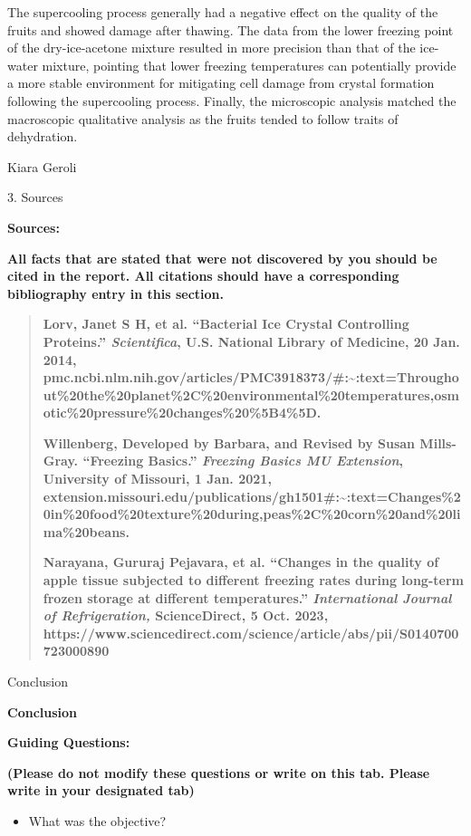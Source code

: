 The supercooling process generally had a negative effect on the quality
of the fruits and showed damage after thawing. The data from the lower
freezing point of the dry-ice-acetone mixture resulted in more precision
than that of the ice-water mixture, pointing that lower freezing
temperatures can potentially provide a more stable environment for
mitigating cell damage from crystal formation following the supercooling
process. Finally, the microscopic analysis matched the macroscopic
qualitative analysis as the fruits tended to follow traits of
dehydration.

Kiara Geroli

3. Sources

\textbf{Sources:\\
}

\textbf{All facts that are stated that were not discovered by you should
be cited in the report. All citations should have a corresponding
bibliography entry in this section.}

\begin{quote}
\textbf{Lorv, Janet S H, et al. ``Bacterial Ice Crystal Controlling
Proteins.'' \emph{Scientifica}, U.S. National Library of Medicine, 20
Jan. 2014,
pmc.ncbi.nlm.nih.gov/articles/PMC3918373/\#:\textasciitilde:text=Throughout\%20the\%20planet\%2C\%20environmental\%20temperatures,osmotic\%20pressure\%20changes\%20\%5B4\%5D.}

\textbf{Willenberg, Developed by Barbara, and Revised by Susan
Mills-Gray. ``Freezing Basics.'' \emph{Freezing Basics \textbar{} MU
Extension}, University of Missouri, 1 Jan. 2021,
extension.missouri.edu/publications/gh1501\#:\textasciitilde:text=Changes\%20in\%20food\%20texture\%20during,peas\%2C\%20corn\%20and\%20lima\%20beans.}

\textbf{Narayana, Gururaj Pejavara, et al. ``Changes in the quality of
apple tissue subjected to different freezing rates during long-term
frozen storage at different temperatures.'' \emph{International Journal
of Refrigeration,} ScienceDirect, 5 Oct. 2023,
https://www.sciencedirect.com/science/article/abs/pii/S0140700723000890}
\end{quote}

Conclusion

\textbf{Conclusion}

\textbf{Guiding Questions:}

\textbf{(Please do not modify these questions or write on this tab.
Please write in your designated tab)}

\begin{itemize}
\item
  What was the objective?
\end{itemize}

